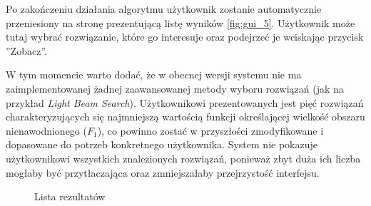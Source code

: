 \documentclass[twoside]{iisthesis}
\begin{document}
Po zakończeniu działania algorytmu użytkownik zostanie automatycznie przeniesiony na stronę prezentującą listę wyników \eqref{fig:gui_5}. Użytkownik może tutaj wybrać rozwiązanie, które go interesuje oraz podejrzeć je wciskając przycisk ''Zobacz''.

W tym momencie warto dodać, że w obecnej wersji systemu nie ma zaimplementowanej żadnej zaawansowanej metody wyboru rozwiązań (jak na przykład \textit{Light Beam Search}). Użytkownikowi prezentowanych jest pięć rozwiązań charakteryzujących się najmniejszą wartością funkcji określającej wielkość obszaru nienawodnionego ($F_{1}$), co powinno zostać w przyszłości zmodyfikowane i dopasowane do potrzeb konkretnego użytkownika. System nie pokazuje użytkownikowi wszystkich znalezionych rozwiązań, ponieważ zbyt duża ich liczba mogłaby być przytłaczająca oraz zmniejszałaby przejrzystość interfejsu.

\begin{figure}[!htb]
	\centering
	\caption{Lista rezultatów}
	\label{fig:gui_5}
\end{figure}
\end{document}
